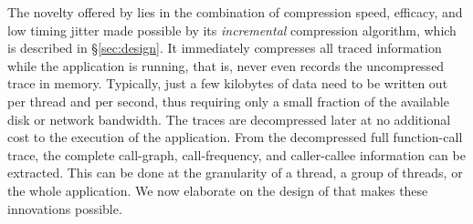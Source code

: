 The novelty offered by \parlot lies in the combination of compression
speed, efficacy, and low timing jitter
made possible by its {\em incremental}
compression algorithm, which is
described in \S\ref{sec:design}.
%
It immediately compresses all traced information while the application is running, that is, \parlot never even records the uncompressed trace in memory. 
%
Typically, just a few kilobytes of data need to be written out per thread and per second, thus requiring only a small fraction of the available disk or network bandwidth. 
%
The traces are decompressed later at no additional cost to the execution of the application. 
%
From the decompressed full function-call trace, the complete call-graph, 
call-frequency, and caller-callee information can be extracted. 
%
This can be done at the granularity of a thread, a group of threads, or the whole application.
%
We now elaborate on the design of \parlot that makes
these innovations possible.







